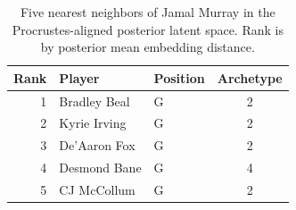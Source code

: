 \begin{table}[htbp]
  \centering\small
  \begin{tabular}{rllc}
    \toprule
    Rank & Player & Position & Archetype \\
    \midrule
    1 & Bradley Beal & G & 2 \\
    2 & Kyrie Irving & G & 2 \\
    3 & De'Aaron Fox & G & 2 \\
    4 & Desmond Bane & G & 4 \\
    5 & CJ McCollum & G & 2 \\
    \bottomrule
  \end{tabular}
  \caption{Five nearest neighbors of Jamal Murray in the Procrustes-aligned posterior latent space. Rank is by posterior mean embedding distance.}
  \label{tab:Jamal_Murray_neighbors}
\end{table}

